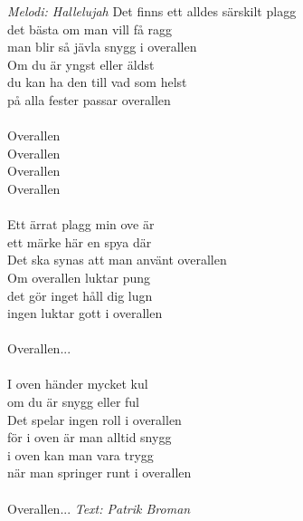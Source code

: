 {\footnotesize\textit{Melodi: Hallelujah}}
\vspace{10pt}
Det finns ett alldes särskilt plagg \\
det bästa om man vill få ragg\\
man blir så jävla snygg i overallen\\
Om du är yngst eller äldst\\
du kan ha den till vad som helst\\
på alla fester passar overallen\\
\\
Overallen\\
Overallen\\
Overallen\\
Overallen\\
\\
Ett ärrat plagg min ove är\\
ett märke här en spya där\\
Det ska synas att man använt overallen\\
Om overallen luktar pung\\
det gör inget håll dig lugn\\
ingen luktar gott i overallen\\
\\
Overallen...\\
\\
I oven händer mycket kul\\
om du är snygg eller ful\\
Det spelar ingen roll i overallen\\
för i oven är man alltid snygg\\
i oven kan man vara trygg\\
när man springer runt i overallen\\
\\
Overallen...
\vspace{10pt}
{\footnotesize\textit{Text: Patrik Broman}}
